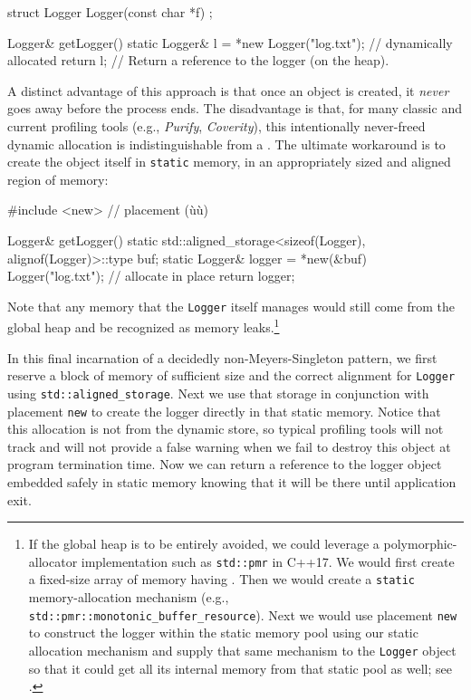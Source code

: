 \begin{emcppshiddenlisting}[emcppsbatch={e12,e13,e16,e17}]
struct Logger {
  Logger(const char *f) {}
};
\end{emcppshiddenlisting}
\begin{emcppslisting}[emcppsbatch=e12]
Logger& getLogger()
{
    static Logger& l = *new Logger("log.txt");  // dynamically allocated
    return l;  // Return a reference to the logger (on the heap).
}
\end{emcppslisting}

\noindent A distinct advantage of this approach is that once an object is created, it
\emph{never} goes away before the process ends. The disadvantage is
that, for many classic and current profiling tools (e.g., \emph{Purify},
\emph{Coverity}), this intentionally never-freed dynamic allocation is
indistinguishable from a . The ultimate workaround
is to create the object itself in \lstinline!static! memory, in an
appropriately sized and aligned region of memory:

\begin{emcppslisting}[emcppsbatch=e13]
#include <new>  // placement (ù{}ù)

Logger& getLogger()
{
    static std::aligned_storage<sizeof(Logger), alignof(Logger)>::type buf;
    static Logger& logger = *new(&buf) Logger("log.txt");  // allocate in place
    return logger;
}
\end{emcppslisting}

\noindent Note that any memory that the \lstinline!Logger! itself manages would still come from the global heap and be recognized as memory leaks.{\cprotect\footnote{If the global heap is to be entirely avoided,
we could leverage a polymorphic-allocator implementation such as
\lstinline!std::pmr! in C++17. We would first create a fixed-size array
of memory having . Then we would
create a \lstinline!static! memory-allocation mechanism (e.g.,
\lstinline!std::pmr::monotonic_buffer_resource!). Next we would use
placement \lstinline!new! to construct the logger within the static
memory pool using our static allocation mechanism and supply that same
mechanism to the \lstinline!Logger! object so that it could get all its
  internal memory from that static pool as well; see \cite{lakos22}.}}

In this final incarnation of a decidedly non-Meyers-Singleton pattern,
we first reserve a block of memory of sufficient size and the correct
alignment for \lstinline!Logger! using \linebreak[4]%
\lstinline!std::aligned_storage!. Next
we use that storage in conjunction with placement \lstinline!new! to create
the logger directly in that static memory. Notice that this allocation
is not from the dynamic store, so typical profiling tools will not track
and will not provide a false warning when we fail to destroy this object
at program termination time. Now we can return a reference to the logger
object embedded safely in static memory knowing that it will be there
until application exit.

